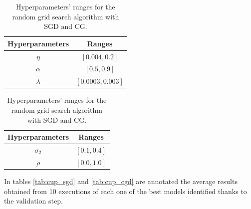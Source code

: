         \begin{table}[H]
          \centering
          \caption{Hyperparameters' ranges for the random grid search algorithm with SGD and CG.}
          \begin{minipage}{.4\textwidth}
              \centering
              \begin{tabular}{| c | c |}
                    \hline
                    Hyperparameters & Ranges\\
                    \hline
                    $\eta$ & $\left [0.004, 0.2\right ]$ \\
                    \hline
                    $\alpha$ & $[0.5, 0.9]$ \\
                    \hline
                    $\lambda$ & $[0.0003, 0.003]$ \\
                    \hline
              \end{tabular}
          \end{minipage}
          \begin{minipage}{.4\textwidth}
              \centering
              \begin{tabular}{| c | c |}
                    \hline
                    Hyperparameters & Ranges\\
                    \hline
                    $\sigma_2$ & $\left [0.1, 0.4 \right ]$\\
                    \hline
                    $\rho$ & $[0.0, 1.0]$ \\
                    \hline
              \end{tabular}
            \end{minipage}
            \label{tab:hyper_cup}
        \end{table}

        In tables \ref{tab:cup_sgd} and \ref{tab:cup_cgd} are annotated the average results obtained from 10 executions of each one of the best models identified thanks to the validation step.

        \begin{table}[H]
                \centering
                \begin{subtable}{\textwidth}
                \end{subtable}
                \caption{Results for the Stochastic Gradient Descent.}
                \label{tab:cup_sgd}
        \end{table}

